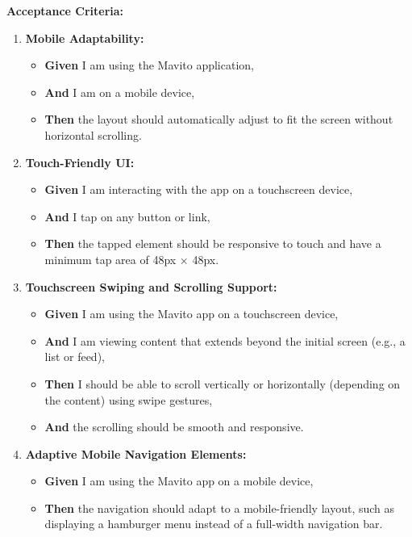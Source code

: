 \documentclass[12pt]{article}
\begin{document}
\vspace{1em}
\textbf{Acceptance Criteria:}
\begin{enumerate}
    \item \textbf{Mobile Adaptability:}
    \begin{itemize}
        \item \textbf{Given} I am using the Mavito application,
        \item \textbf{And} I am on a mobile device,
        \item \textbf{Then} the layout should automatically adjust to fit the screen without horizontal scrolling.
    \end{itemize}

    \item \textbf{Touch-Friendly UI:}
    \begin{itemize}
        \item \textbf{Given} I am interacting with the app on a touchscreen device,
        \item \textbf{And} I tap on any button or link,
        \item \textbf{Then} the tapped element should be responsive to touch and have a minimum tap area of 48px × 48px.
    \end{itemize}

    \item \textbf{Touchscreen Swiping and Scrolling Support:}
    \begin{itemize}
        \item \textbf{Given} I am using the Mavito app on a touchscreen device,
        \item \textbf{And} I am viewing content that extends beyond the initial screen (e.g., a list or feed),
        \item \textbf{Then} I should be able to scroll vertically or horizontally (depending on the content) using swipe gestures,
        \item \textbf{And} the scrolling should be smooth and responsive.
    \end{itemize}

    \item \textbf{Adaptive Mobile Navigation Elements:}
    \begin{itemize}
        \item \textbf{Given} I am using the Mavito app on a mobile device,
        \item \textbf{Then} the navigation should adapt to a mobile-friendly layout, such as displaying a hamburger menu instead of a full-width navigation bar.
    \end{itemize}


\end{enumerate}
\end{document}
